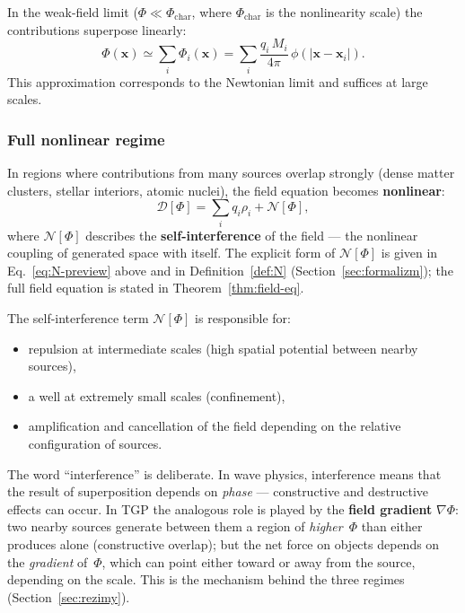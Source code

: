 In the weak-field limit ($\Phi \ll \Phi_{\mathrm{char}}$, where
$\Phi_{\mathrm{char}}$ is the nonlinearity scale) the contributions
superpose linearly:
\begin{equation}\label{eq:Phi-linear}
    \Phi(\mathbf{x})
    \simeq \sum_{i} \Phi_i(\mathbf{x})
    = \sum_{i} \frac{q_i\,M_i}{4\pi}\,
      \phi(|\mathbf{x}-\mathbf{x}_i|).
\end{equation}
This approximation corresponds to the Newtonian limit and suffices
at large scales.

\subsubsection{Full nonlinear regime}

In regions where contributions from many sources overlap strongly
(dense matter clusters, stellar interiors, atomic nuclei), the field
equation becomes \textbf{nonlinear}:
\begin{equation}\label{eq:Phi-nonlinear}
    \mathcal{D}[\Phi]
    = \sum_{i} q_i \rho_i
    + \mathcal{N}[\Phi],
\end{equation}
where $\mathcal{N}[\Phi]$ describes the \textbf{self-interference} of
the field --- the nonlinear coupling of generated space with itself.
The explicit form of $\mathcal{N}[\Phi]$ is given in
Eq.~\eqref{eq:N-preview} above and in Definition~\ref{def:N}
(Section~\ref{sec:formalizm}); the full field equation is stated in
Theorem~\ref{thm:field-eq}.

The self-interference term $\mathcal{N}[\Phi]$ is responsible for:
\begin{itemize}[nosep]
  \item repulsion at intermediate scales (high spatial potential
        between nearby sources),
  \item a well at extremely small scales (confinement),
  \item amplification and cancellation of the field depending on the
        relative configuration of sources.
\end{itemize}

\begin{remark}
The word ``interference'' is deliberate.  In wave physics,
interference means that the result of superposition depends on
\emph{phase} --- constructive and destructive effects can occur.
In TGP the analogous role is played by the \textbf{field gradient}
$\nabla\Phi$: two nearby sources generate between them a region of
\emph{higher}~$\Phi$ than either produces alone (constructive
overlap); but the net force on objects depends on the
\emph{gradient} of~$\Phi$, which can point either toward or away
from the source, depending on the scale.  This is the mechanism
behind the three regimes (Section~\ref{sec:rezimy}).
\end{remark}

